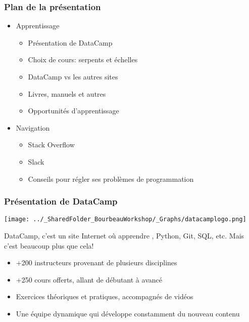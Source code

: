 \documentclass{beamer}
\begin{document}
    \begin{frame}
    
        \frametitle{Plan de la présentation} \vspace{1cm}
        
        \begin{itemize}
        
        \item{Apprentissage}
        
          \begin{itemize}
            \item Présentation de DataCamp 
            \item Choix de cours: serpents et échelles
            \item DataCamp vs les autres sites
            \item Livres, manuels et autres 
            \item Opportunités d'apprentissage
          \end{itemize}
        
         \item{Navigation}
         
          \begin{itemize}
            \item{Stack Overflow}
            \item{Slack}
            \item{Conseils pour régler ses problèmes de programmation}
          \end{itemize}
          
        \end{itemize}
        
    \end{frame}


    \begin{frame}
    
      \frametitle{Présentation de DataCamp} \vspace{1cm}
      
        \begin{center}
         \texttt{[image: ../\_SharedFolder\_BourbeauWorkshop/\_Graphs/datacamplogo.png]}
        \end{center} 
      
    DataCamp, c'est un site Internet où apprendre \R, Python, Git, SQL, etc. Mais c'est beaucoup plus que cela!
    
        \begin{itemize}
          \item{+200 instructeurs provenant de plusieurs disciplines}
          \item{+250 cours offerts, allant de débutant à avancé}
          \item{Exercices théoriques et pratiques, accompagnés de vidéos}
          \item{Une équipe dynamique qui développe constamment du nouveau contenu}
        \end{itemize}
          
    \end{frame}
    
\end{document}
